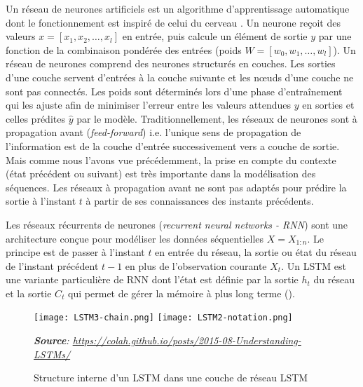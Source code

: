 Un réseau de neurones artificiels est un algorithme d'apprentissage automatique dont le fonctionnement est inspiré de celui du cerveau \citep{mcculloch1943nervousactivity,rosenblatt1958perceptron}. Un neurone reçoit des valeurs $x = [x_1, x_2, \dots, x_l]$ en entrée, puis calcule un élément de sortie $y$ par une fonction de la combinaison pondérée  des entrées (poids $W = [w_0, w_1, \dots, w_l]$).
Un réseau de neurones comprend des neurones structurés en couches. Les sorties d'une couche servent d'entrées à la couche suivante et les n\oe{}uds d'une couche ne sont pas connectés. Les poids sont déterminés lors d'une phase d'entraînement qui les ajuste afin de minimiser l'erreur entre les valeurs attendues $y$ en sorties et celles prédites $\hat{y}$ par le modèle.
Traditionnellement, les réseaux de neurones sont à \og propagation avant \fg{} (\textit{feed-forward}) i.e. l'unique sens de propagation de l'information est de la couche d'entrée successivement vers a couche de sortie. Mais comme nous l'avons vue précédemment, la prise en compte du contexte (état précédent ou suivant) est très importante dans la modélisation des séquences. Les réseaux à propagation avant ne sont pas adaptés pour prédire la sortie à l'instant $t$ à partir de ses connaissances des instants précédents.

Les réseaux récurrents de neurones (\textit{recurrent neural networks - RNN}) \citep{jordan1986serialorder_rnn,elman1990findingstructure_rnn} sont une architecture conçue pour modéliser les données séquentielles $X = X_{1:n}$. Le principe est de passer à l'instant $t$ en entrée du réseau, la sortie ou état du réseau de l'instant précédent $t-1$ en plus de l'observation courante $X_t$. Un LSTM est une variante particulière de RNN dont l'état est définie par la sortie $h_t$ du réseau et la sortie $C_t$ qui permet de gérer la mémoire à plus long terme  (). 

\begin{figure}[!htb]
	\centering \texttt{[image: LSTM3-chain.png]}
	\texttt{[image: LSTM2-notation.png]}
	
\textit{\footnotesize{\textbf{Source}: \url{https://colah.github.io/posts/2015-08-Understanding-LSTMs/}}}
	\caption{Structure interne d'un LSTM dans une couche de réseau LSTM}\label{fig:structuration:couchedelstm}
\end{figure}


